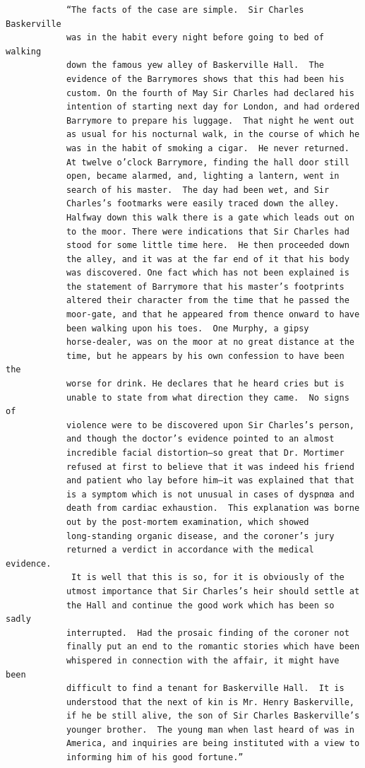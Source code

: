 \documentclass{article}
\begin{document}
\begin{verbatim}
            “The facts of the case are simple.  Sir Charles Baskerville
            was in the habit every night before going to bed of walking
            down the famous yew alley of Baskerville Hall.  The
            evidence of the Barrymores shows that this had been his
            custom. On the fourth of May Sir Charles had declared his
            intention of starting next day for London, and had ordered
            Barrymore to prepare his luggage.  That night he went out
            as usual for his nocturnal walk, in the course of which he
            was in the habit of smoking a cigar.  He never returned.
            At twelve o’clock Barrymore, finding the hall door still
            open, became alarmed, and, lighting a lantern, went in
            search of his master.  The day had been wet, and Sir
            Charles’s footmarks were easily traced down the alley.
            Halfway down this walk there is a gate which leads out on
            to the moor. There were indications that Sir Charles had
            stood for some little time here.  He then proceeded down
            the alley, and it was at the far end of it that his body
            was discovered. One fact which has not been explained is
            the statement of Barrymore that his master’s footprints
            altered their character from the time that he passed the
            moor-gate, and that he appeared from thence onward to have
            been walking upon his toes.  One Murphy, a gipsy
            horse-dealer, was on the moor at no great distance at the
            time, but he appears by his own confession to have been the
            worse for drink. He declares that he heard cries but is
            unable to state from what direction they came.  No signs of
            violence were to be discovered upon Sir Charles’s person,
            and though the doctor’s evidence pointed to an almost
            incredible facial distortion—so great that Dr. Mortimer
            refused at first to believe that it was indeed his friend
            and patient who lay before him—it was explained that that
            is a symptom which is not unusual in cases of dyspnœa and
            death from cardiac exhaustion.  This explanation was borne
            out by the post-mortem examination, which showed
            long-standing organic disease, and the coroner’s jury
            returned a verdict in accordance with the medical evidence.
             It is well that this is so, for it is obviously of the
            utmost importance that Sir Charles’s heir should settle at
            the Hall and continue the good work which has been so sadly
            interrupted.  Had the prosaic finding of the coroner not
            finally put an end to the romantic stories which have been
            whispered in connection with the affair, it might have been
            difficult to find a tenant for Baskerville Hall.  It is
            understood that the next of kin is Mr. Henry Baskerville,
            if he be still alive, the son of Sir Charles Baskerville’s
            younger brother.  The young man when last heard of was in
            America, and inquiries are being instituted with a view to
            informing him of his good fortune.”


\end{verbatim}
\end{document}
